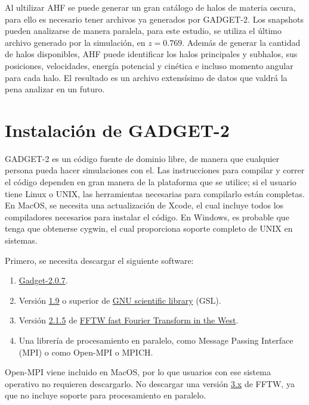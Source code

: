 \documentclass[a4paper,openright,12pt]{book}
\begin{document}
Al ultilizar AHF se puede generar un gran catálogo de halos de materia oscura, para ello es necesario tener archivos ya generados por GADGET-2. Los \textsf{snapshots} pueden analizarse de manera paralela, para este estudio, se utiliza el último archivo generado por la simulación, en $z = 0.769$. Además de generar la cantidad de halos disponibles, AHF puede identificar los halos principales y subhalos, sus posiciones, velocidades, energía potencial y cinética e incluso momento angular para cada halo. El resultado es un archivo extensísimo de datos que valdrá la pena analizar en un futuro.


\appendix 
\chapter{Instalación de GADGET-2}\label{Apend.A}
GADGET-2 es un código fuente de dominio libre, de manera que cualquier persona pueda hacer simulaciones con el. Las instrucciones para compilar y correr el código dependen en gran manera de la plataforma que se utilice; si el usuario tiene Linux o UNIX, las herramientas necesarias para compilarlo están completas. En MacOS, se necesita una actualización de \textsf{Xcode}, el cual incluye todos los compiladores necesarios para instalar el código. En Windows, es probable que tenga que obtenerse \textsf{cygwin}, el cual proporciona soporte completo de UNIX en sistemas.

Primero, se necesita descargar el siguiente software:
\begin{enumerate}
\item \underline{Gadget-2.0.7}.
\item Versión \underline{1.9} o superior de \underline{GNU scientific library} (GSL).
\item Versión \underline{2.1.5} de \underline{FFTW fast Fourier Transform in the West}.
\item Una librería de procesamiento en paralelo, como Message Passing Interface (MPI) o como \textsf{Open-MPI} o \textsf{MPICH}.
\end{enumerate}

\textsf{Open-MPI} viene incluido en MacOS, por lo que usuarios con ese sistema operativo no requieren descargarlo. No descargar una versión \underline{3.x} de FFTW, ya que no incluye soporte para procesamiento en paralelo.
\end{document}
